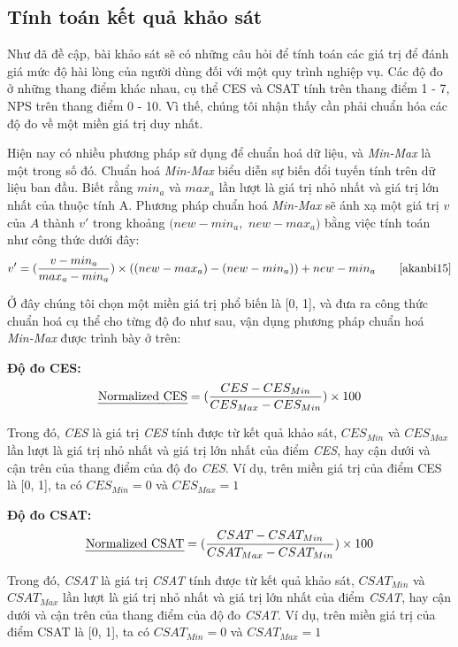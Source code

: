 \subsection{Tính toán kết quả khảo sát}
Như đã đề cập, bài khảo sát sẽ có những câu hỏi để tính toán các giá trị để đánh giá mức độ hài lòng của người dùng đối với một quy trình nghiệp vụ. Các độ đo ở những thang điểm khác nhau, cụ thể CES và CSAT tính trên thang điểm 1 - 7, NPS trên thang điểm 0 - 10. Vì thế, chúng tôi nhận thấy cần phải chuẩn hóa các độ đo về một miền giá trị duy nhất. 
\par
Hiện nay có nhiều phương pháp sử dụng để chuẩn hoá dữ liệu, và \emph{Min-Max} là một trong số đó. Chuẩn hoá \emph{Min-Max} biểu diễn sự biến đổi tuyến tính trên dữ liệu ban đầu. Biết rằng $min_a$ và $max_a$ lần lượt là giá trị nhỏ nhất và giá trị lớn nhất của thuộc tính A. Phương pháp chuẩn hoá \emph{Min-Max} sẽ ánh xạ một giá trị $v$ của $A$ thành $v'$ trong khoảng $(new-min_a,$ $new-max_a)$ bằng việc tính toán như công thức dưới đây:
\[ v' = (\frac{v - min_a}{max_a - min_a}) \times ((new-max_a) - (new-min_a)) + new-min_a \tag*{\cite{akanbi15}}\]

Ở đây chúng tôi chọn một miền giá trị phổ biến là [0, 1], và đưa ra công thức chuẩn hoá cụ thể cho từng độ đo như sau, vận dụng phương pháp chuẩn hoá \emph{Min-Max} được trình bày ở trên:

\textbf{Độ đo CES:}
\[ \text{\emph{Normalized CES}} = (\frac{CES - CES_{Min}}{CES_{Max} - CES_{Min}}) \times 100\]
\par
Trong đó, \emph{CES} là giá trị \emph{CES} tính được từ kết quả khảo sát, $CES_{Min}$ và $CES_{Max}$ lần lượt là giá trị nhỏ nhất và giá trị lớn nhất của điểm \emph{CES}, hay cận dưới và cận trên của thang điểm của độ đo \emph{CES}. Ví dụ, trên miền giá trị của điểm CES là [0, 1], ta có $CES_{Min} = 0$ và $CES_{Max} = 1$

\textbf{Độ đo CSAT:}
\[ \text{\emph{Normalized CSAT}} = (\frac{CSAT - CSAT_{Min}}{CSAT_{Max} - CSAT_{Min}}) \times 100\]
\par
Trong đó, \emph{CSAT} là giá trị \emph{CSAT} tính được từ kết quả khảo sát, $CSAT_{Min}$ và $CSAT_{Max}$ lần lượt là giá trị nhỏ nhất và giá trị lớn nhất của điểm \emph{CSAT}, hay cận dưới và cận trên của thang điểm của độ đo \emph{CSAT}. Ví dụ, trên miền giá trị của điểm CSAT là [0, 1], ta có $CSAT_{Min} = 0$ và $CSAT_{Max} = 1$


